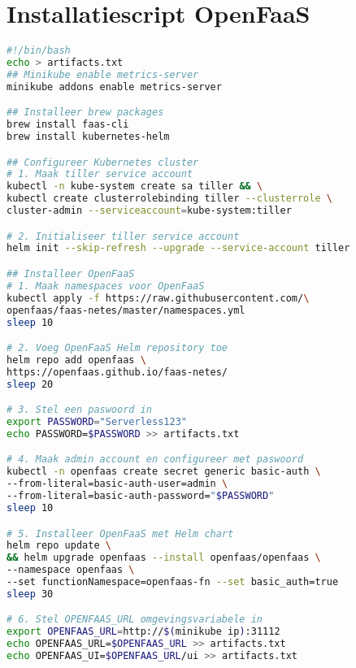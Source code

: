 \section{Installatiescript OpenFaaS}
\label{sec:installatie-openfaas}
\begin{lstlisting}[language=bash]
#!/bin/bash
echo > artifacts.txt
## Minikube enable metrics-server
minikube addons enable metrics-server

## Installeer brew packages
brew install faas-cli
brew install kubernetes-helm

## Configureer Kubernetes cluster
# 1. Maak tiller service account
kubectl -n kube-system create sa tiller && \
kubectl create clusterrolebinding tiller --clusterrole \
cluster-admin --serviceaccount=kube-system:tiller

# 2. Initialiseer tiller service account
helm init --skip-refresh --upgrade --service-account tiller

## Installeer OpenFaaS
# 1. Maak namespaces voor OpenFaaS 
kubectl apply -f https://raw.githubusercontent.com/\
openfaas/faas-netes/master/namespaces.yml
sleep 10

# 2. Voeg OpenFaaS Helm repository toe
helm repo add openfaas \
https://openfaas.github.io/faas-netes/
sleep 20

# 3. Stel een paswoord in
export PASSWORD="Serverless123"
echo PASSWORD=$PASSWORD >> artifacts.txt

# 4. Maak admin account en configureer met paswoord
kubectl -n openfaas create secret generic basic-auth \
--from-literal=basic-auth-user=admin \
--from-literal=basic-auth-password="$PASSWORD"
sleep 10

# 5. Installeer OpenFaaS met Helm chart
helm repo update \
&& helm upgrade openfaas --install openfaas/openfaas \
--namespace openfaas \
--set functionNamespace=openfaas-fn --set basic_auth=true
sleep 30

# 6. Stel OPENFAAS_URL omgevingsvariabele in
export OPENFAAS_URL=http://$(minikube ip):31112
echo OPENFAAS_URL=$OPENFAAS_URL >> artifacts.txt
echo OPENFAAS_UI=$OPENFAAS_URL/ui >> artifacts.txt
\end{lstlisting}